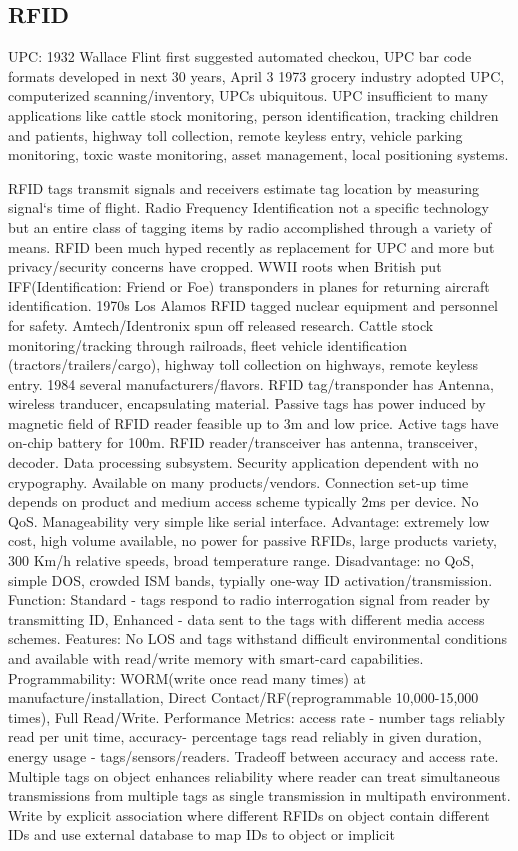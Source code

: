 \documentclass[9pt]{extarticle}
\begin{document}
\begin{multicols}{2}
\section{RFID}

UPC: 1932 Wallace Flint first suggested automated checkou, UPC bar code formats developed in next 30 years, April 3 1973 grocery industry adopted UPC, computerized scanning/inventory, UPCs ubiquitous. UPC insufficient to many applications like cattle stock monitoring, person identification, tracking children and patients, highway toll collection, remote keyless entry, vehicle parking monitoring, toxic waste monitoring, asset management, local positioning systems.

RFID tags transmit signals and receivers estimate tag location
by measuring signal‘s time of flight. Radio Frequency Identification not a specific technology but an entire class of tagging items by radio accomplished through a variety of means. RFID been much hyped recently as replacement for UPC and more but privacy/security concerns have cropped. WWII roots when British put IFF(Identification: Friend or Foe) transponders in planes for returning aircraft identification. 1970s Los Alamos RFID tagged nuclear equipment and personnel for safety. Amtech/Identronix spun off released research. Cattle stock monitoring/tracking through railroads, fleet vehicle identification (tractors/trailers/cargo), highway toll collection on highways, remote keyless entry. 1984 several manufacturers/flavors. RFID tag/transponder has Antenna, wireless tranducer, encapsulating material. Passive tags has power induced by magnetic field of RFID reader feasible up to 3m and low price. Active tags have on-chip battery for 100m. RFID reader/transceiver has antenna, transceiver, decoder. Data processing subsystem. Security application dependent with no crypography. Available on many products/vendors. Connection set-up time depends on product and medium access scheme typically 2ms per device. No QoS. Manageability very simple like serial interface. Advantage: extremely low cost, high volume available, no power for passive RFIDs, large  products variety, 300 Km/h relative speeds, broad temperature range. Disadvantage: no QoS, simple DOS, crowded ISM bands, typially one-way ID activation/transmission. Function: Standard - tags respond to radio interrogation signal from reader by transmitting ID, Enhanced - data sent to the tags with different media access schemes.  Features: No LOS and tags withstand difficult environmental conditions and available with read/write memory with smart-card capabilities. Programmability: WORM(write once read many times) at manufacture/installation, Direct Contact/RF(reprogrammable 10,000-15,000 times), Full Read/Write. Performance Metrics: access rate - number tags reliably read per unit time, accuracy- percentage tags read reliably in given duration, energy usage - tags/sensors/readers. Tradeoff between accuracy and access rate.  Multiple tags on object enhances reliability where reader can treat simultaneous transmissions from multiple tags as single transmission in multipath environment. Write by explicit association where different RFIDs on object contain different IDs and use external database to map IDs to object or implicit 
\end{multicols}
\end{document}
